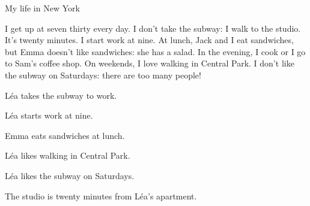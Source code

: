\begin{anglais}
\begin{tcolorbox}[otBase,colback=white,colframe=otRule,boxrule=0.5pt,fontupper=\fontsize{10.8}{14.4}\selectfont]
{\otSemi\fontsize{11}{13}\selectfont My life in New York}\par\vspace{1.4mm}
I get up at seven thirty every day. I don't take the subway: I walk to the studio. It's twenty
minutes. I start work at nine. At lunch, Jack and I eat sandwiches, but Emma doesn't like
sandwiches: she has a salad. In the evening, I cook or I go to Sam's coffee shop. On weekends, I
love walking in Central Park. I don't like the subway on Saturdays: there are too many people!
\par{}
\end{tcolorbox}
\begin{questions}[2]
\item Léa takes the subway to work. \hfill{}
\item Léa starts work at nine. \hfill{}
\item Emma eats sandwiches at lunch. \hfill{}
\item Léa likes walking in Central Park. \hfill{}
\item Léa likes the subway on Saturdays. \hfill{}
\item The studio is twenty minutes from Léa's apartment. \hfill{}
\end{questions}
\end{anglais}



